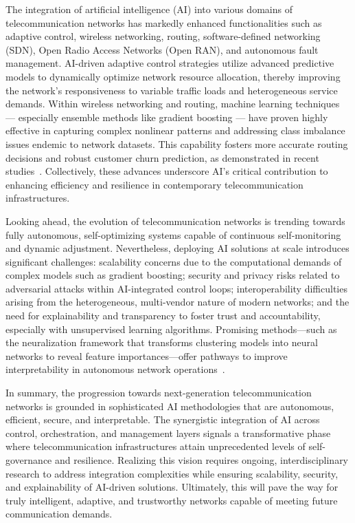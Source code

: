 \documentclass[sigconf]{acmart}
\begin{document}
The integration of artificial intelligence (AI) into various domains of telecommunication networks has markedly enhanced functionalities such as adaptive control, wireless networking, routing, software-defined networking (SDN), Open Radio Access Networks (Open RAN), and autonomous fault management. AI-driven adaptive control strategies utilize advanced predictive models to dynamically optimize network resource allocation, thereby improving the network’s responsiveness to variable traffic loads and heterogeneous service demands. Within wireless networking and routing, machine learning techniques — especially ensemble methods like gradient boosting — have proven highly effective in capturing complex nonlinear patterns and addressing class imbalance issues endemic to network datasets. This capability fosters more accurate routing decisions and robust customer churn prediction, as demonstrated in recent studies~\cite{ref17}. Collectively, these advances underscore AI’s critical contribution to enhancing efficiency and resilience in contemporary telecommunication infrastructures.

Looking ahead, the evolution of telecommunication networks is trending towards fully autonomous, self-optimizing systems capable of continuous self-monitoring and dynamic adjustment. Nevertheless, deploying AI solutions at scale introduces significant challenges: scalability concerns due to the computational demands of complex models such as gradient boosting; security and privacy risks related to adversarial attacks within AI-integrated control loops; interoperability difficulties arising from the heterogeneous, multi-vendor nature of modern networks; and the need for explainability and transparency to foster trust and accountability, especially with unsupervised learning algorithms. Promising methods—such as the neuralization framework that transforms clustering models into neural networks to reveal feature importances—offer pathways to improve interpretability in autonomous network operations~\cite{ref45}.

In summary, the progression towards next-generation telecommunication networks is grounded in sophisticated AI methodologies that are autonomous, efficient, secure, and interpretable. The synergistic integration of AI across control, orchestration, and management layers signals a transformative phase where telecommunication infrastructures attain unprecedented levels of self-governance and resilience. Realizing this vision requires ongoing, interdisciplinary research to address integration complexities while ensuring scalability, security, and explainability of AI-driven solutions. Ultimately, this will pave the way for truly intelligent, adaptive, and trustworthy networks capable of meeting future communication demands.
\end{document}
